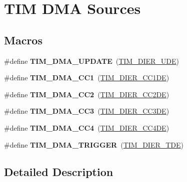 \hypertarget{group___t_i_m___d_m_a__sources}{\section{T\-I\-M D\-M\-A Sources}
\label{group___t_i_m___d_m_a__sources}
}
\subsection*{Macros}
\begin{DoxyCompactItemize}
\item 
\hypertarget{group___t_i_m___d_m_a__sources_ga45816ad15a4f533027eb202ac0b9aaf5}{\#define {\bfseries T\-I\-M\-\_\-\-D\-M\-A\-\_\-\-U\-P\-D\-A\-T\-E}~(\hyperlink{group___peripheral___registers___bits___definition_gab9f47792b1c2f123464a2955f445c811}{T\-I\-M\-\_\-\-D\-I\-E\-R\-\_\-\-U\-D\-E})}\label{group___t_i_m___d_m_a__sources_ga45816ad15a4f533027eb202ac0b9aaf5}

\item 
\hypertarget{group___t_i_m___d_m_a__sources_ga33b93e8bb82fe8e167b9e9c962c54f83}{\#define {\bfseries T\-I\-M\-\_\-\-D\-M\-A\-\_\-\-C\-C1}~(\hyperlink{group___peripheral___registers___bits___definition_gae181bb16ec916aba8ba86f58f745fdfd}{T\-I\-M\-\_\-\-D\-I\-E\-R\-\_\-\-C\-C1\-D\-E})}\label{group___t_i_m___d_m_a__sources_ga33b93e8bb82fe8e167b9e9c962c54f83}

\item 
\hypertarget{group___t_i_m___d_m_a__sources_ga792f73196a8e7424655592097d7a3fd5}{\#define {\bfseries T\-I\-M\-\_\-\-D\-M\-A\-\_\-\-C\-C2}~(\hyperlink{group___peripheral___registers___bits___definition_ga58f97064991095b28c91028ca3cca28e}{T\-I\-M\-\_\-\-D\-I\-E\-R\-\_\-\-C\-C2\-D\-E})}\label{group___t_i_m___d_m_a__sources_ga792f73196a8e7424655592097d7a3fd5}

\item 
\hypertarget{group___t_i_m___d_m_a__sources_ga3eb2dadbd3109bced45935fb53deeee1}{\#define {\bfseries T\-I\-M\-\_\-\-D\-M\-A\-\_\-\-C\-C3}~(\hyperlink{group___peripheral___registers___bits___definition_ga1567bff5dc0564b26a8b3cff1f0fe0a4}{T\-I\-M\-\_\-\-D\-I\-E\-R\-\_\-\-C\-C3\-D\-E})}\label{group___t_i_m___d_m_a__sources_ga3eb2dadbd3109bced45935fb53deeee1}

\item 
\hypertarget{group___t_i_m___d_m_a__sources_ga59495cf79894dfe5e5b2029863aed956}{\#define {\bfseries T\-I\-M\-\_\-\-D\-M\-A\-\_\-\-C\-C4}~(\hyperlink{group___peripheral___registers___bits___definition_gaaba034412c54fa07024e516492748614}{T\-I\-M\-\_\-\-D\-I\-E\-R\-\_\-\-C\-C4\-D\-E})}\label{group___t_i_m___d_m_a__sources_ga59495cf79894dfe5e5b2029863aed956}

\item 
\hypertarget{group___t_i_m___d_m_a__sources_ga21912fd910242e0f63bf9b0953e41c63}{\#define {\bfseries T\-I\-M\-\_\-\-D\-M\-A\-\_\-\-T\-R\-I\-G\-G\-E\-R}~(\hyperlink{group___peripheral___registers___bits___definition_ga5a752d4295f100708df9b8be5a7f439d}{T\-I\-M\-\_\-\-D\-I\-E\-R\-\_\-\-T\-D\-E})}\label{group___t_i_m___d_m_a__sources_ga21912fd910242e0f63bf9b0953e41c63}

\end{DoxyCompactItemize}


\subsection{Detailed Description}
